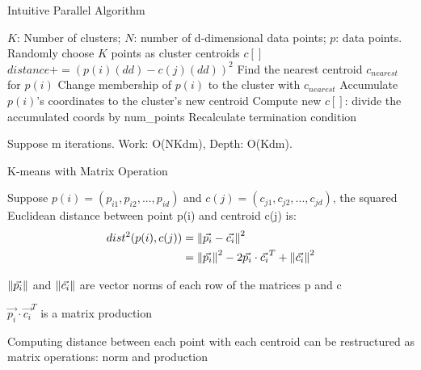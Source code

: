 \documentclass[
nopagebreaks,
style=klope,
fleqn]{powerdot}
\begin{document}
\begin{slide} {Intuitive Parallel Algorithm}
  \footnotesize
  \begin{algorithmic}[1]
    \INPUT $K$: Number of clusters; $N$: number of d-dimensional data points; $p$: data points.
     \label{alg:p}
    \State Randomly choose $K$ points as cluster centroids $c[]$
    \State $distance += (p(i)(dd) - c(j)(dd))^2$
    \EndFor
    \EndFor
    \State Find the nearest centroid $c_{nearest}$ for $p(i)$
    \State Change membership of $p(i)$ to the cluster with $c_{nearest}$
    \State Accumulate $p(i)$'s coordinates to the cluster's new centroid
    \EndParFor
    \State Compute new $c[]$: divide the accumulated coords by num\_points
    \State Recalculate termination condition
    \EndWhile
    \EndFunction  
  \end{algorithmic}
  \begin{compactitem}
    \vspace{5mm}
  \item{Suppose m iterations. 
    Work: O(NKdm), Depth: O(Kdm).}
  \end{compactitem}
\end{slide}

\begin{slide}{K-means with Matrix Operation}
  \footnotesize
  \begin{compactitem}
  \item{Suppose $p(i) = (p_{i1}, p_{i2}, ..., p_{id})$ and $c(j) = (c_{j1},
    c_{j2}, ..., c_{jd})$, the squared Euclidean distance between point p(i) and centroid c(j) is: 
    \begin{align}
      dist^2(p(i),c(j)) &= \left\lVert\vec{p_i} - \vec{c_i}\right\rVert^2 \\
             &= \left\lVert\vec{p_i}\right\rVert^2 - 2 \vec{p_i} \cdot \vec{c_i}^T + \left\lVert\vec{c_i}\right\rVert^2 \\
  \end{align}}
  \item{
      $\left\lVert\vec{p_i}\right\rVert$ and $\left\lVert\vec{c_i}\right\rVert$ are vector norms of each row of the matrices p and c
  }
  \item{
      $\vec{p_i} \cdot \vec{c_i}^T$ is a matrix production 
  }
  \item{Computing distance between each point with each centroid can be restructured as matrix operations: norm and production}
  \end{compactitem}
\end{slide}
\end{document}
